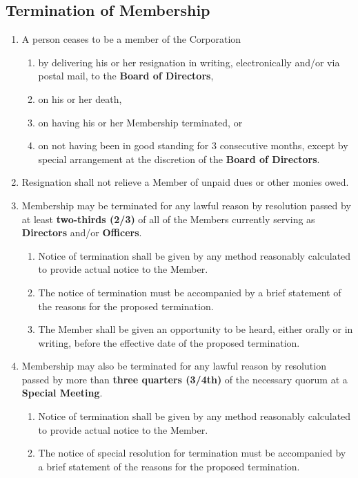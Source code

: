 \documentclass{article}
\begin{document}
\subsection{Termination of Membership}
\begin{enumerate}
	\item A person ceases to be a member of the Corporation
	\begin{enumerate}
		\item by delivering his or her resignation in writing, electronically and/or via postal mail, to the \textbf{Board of Directors},
		\item on his or her death,
		\item on having his or her Membership terminated, or
		\item on not having been in good standing for 3 consecutive months, except by special arrangement at the discretion of the \textbf{Board of Directors}.
	\end{enumerate}
	\item Resignation shall not relieve a Member of unpaid dues or other monies owed.
	\item Membership may be terminated for any lawful reason by resolution passed by at least \textbf{two-thirds (2/3)} of all of the Members currently serving as \textbf{Directors} and/or \textbf{Officers}.
	\begin{enumerate}
		\item Notice of termination shall be given by any method reasonably calculated to provide actual notice to the Member.
		\item The notice of termination must be accompanied by a brief statement of the reasons for the proposed termination.
		\item The Member shall be given an opportunity to be heard, either orally or in writing, before the effective date of the proposed termination.
	\end{enumerate}
	\item Membership may also be terminated for any lawful reason by resolution passed by more than \textbf{three quarters (3/4th)} of the necessary quorum at a \textbf{Special Meeting}.
	\begin{enumerate}
		\item Notice of termination shall be given by any method reasonably calculated to provide actual notice to the Member.
		\item The notice of special resolution for termination must be accompanied by a brief statement of the reasons for the proposed termination.

\end{enumerate}
\end{enumerate}
\end{document}
